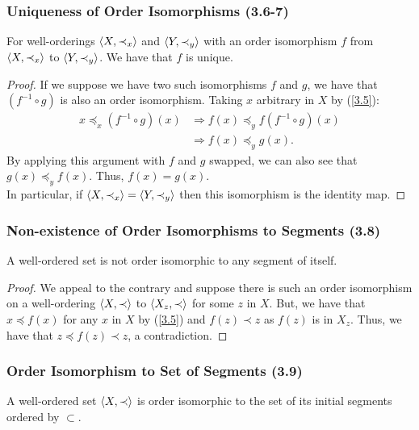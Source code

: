 \subsubsection{Uniqueness of Order Isomorphisms (3.6-7)} \label{3.6} \label{3.7}

For well-orderings ${\langle X, \prec_x \rangle}$ and ${\langle Y, \prec_y \rangle}$
with an order isomorphism $f$ from ${\langle X, \prec_x \rangle}$ to ${\langle Y, \prec_y \rangle}$. 
We have that $f$ is unique.

\begin{proof}
    If we suppose we have two such isomorphisms $f$ and $g$,
    we have that $(f^{-1} \circ g)$ is also an order
    isomorphism. Taking $x$ arbitrary in $X$ by (\ref{3.5}): \begin{align*}
        x \preceq_x (f^{-1} \circ g)(x)
        &\Longrightarrow f(x) \preceq_y f(f^{-1} \circ g)(x) \\
        &\Longrightarrow f(x) \preceq_y g(x).
    \end{align*} By applying this argument with $f$ and $g$ swapped, we 
    can also see that $g(x) \preceq_y f(x)$. Thus, $f(x) = g(x)$.
    \\[\baselineskip]
    In particular, if ${\langle X, \prec_x \rangle} = {\langle Y, \prec_y \rangle}$
    then this isomorphism is the identity map.
\end{proof}

\subsubsection{Non-existence of Order Isomorphisms to Segments (3.8)} \label{3.8}

A well-ordered set is not order isomorphic to any segment of itself.

\begin{proof}
    We appeal to the contrary and suppose there is such
    an order isomorphism on a well-ordering ${\langle X, \prec \rangle}$
    to ${\langle X_z, \prec \rangle}$ for some $z$ in $X$.
    But, we have that $x \preceq f(x)$ for any $x$ in $X$ by (\ref{3.5})
    and $f(z) \prec z$ as $f(z)$ is in $X_z$.
    Thus, we have that $z \preceq f(z) \prec z$, a contradiction.
\end{proof}

\subsubsection{Order Isomorphism to Set of Segments (3.9)} \label{3.9}

A well-ordered set ${\langle X, \prec \rangle}$ is order isomorphic to the set
of its initial segments ordered by $\subset$.

